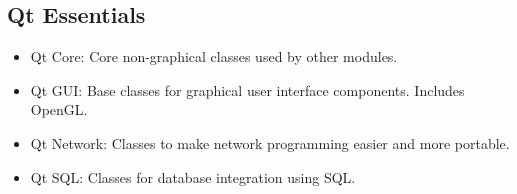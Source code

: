 
\begin{issues}
\issueDraft
\end{issues}

\subsection{Qt Essentials}
\begin{itemize}
\item Qt Core: Core non-graphical classes used by other modules.
\item Qt GUI: Base classes for graphical user interface components. Includes OpenGL.
\item Qt Network: Classes to make network programming easier and more portable.
\item Qt SQL: Classes for database integration using SQL.
\end{itemize}

